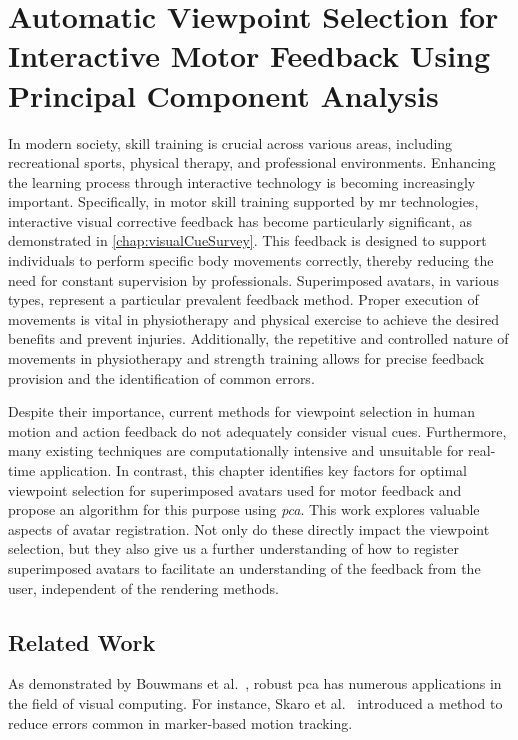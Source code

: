 
\chapter[Automatic Viewpoint Selection for Interactive Motor Feedback Using PCA]{Automatic Viewpoint Selection for Interactive Motor Feedback Using Principal Component Analysis\label{chap:viewpoint}}
In modern society, skill training is crucial across various areas, including recreational sports, physical therapy, and professional environments. Enhancing the learning process through interactive technology is becoming increasingly important. Specifically, in motor skill training supported by \acrshort{mr} technologies, interactive visual corrective feedback has become particularly significant, as demonstrated in \autoref{chap:visualCueSurvey}. This feedback is designed to support individuals to perform specific body movements correctly, thereby reducing the need for constant supervision by professionals. Superimposed avatars, in various types, represent a particular prevalent feedback method. Proper execution of movements is vital in physiotherapy and physical exercise to achieve the desired benefits and prevent injuries. Additionally, the repetitive and controlled nature of movements in physiotherapy and strength training allows for precise feedback provision and the identification of common errors.

Despite their importance, current methods for viewpoint selection in human motion and action feedback do not adequately consider visual cues. Furthermore, many existing techniques are computationally intensive and unsuitable for real-time application. In contrast, this chapter identifies key factors for optimal viewpoint selection for superimposed avatars used for motor feedback and propose an algorithm for this purpose using \emph{\acrshort{pca}}. This work explores valuable aspects of avatar registration. Not only do these directly impact the viewpoint selection, but they also give us a further understanding of how to register superimposed avatars to facilitate an understanding of the feedback from the user, independent of the rendering methods.

\section{Related Work \label{sec:relView}}
As demonstrated by Bouwmans et al.~\cite{bouwmans2018arpca}, robust \acrshort{pca} has numerous applications in the field of visual computing. For instance, Skaro et al.~\cite{skaro2021knac} introduced a method to reduce errors common in marker-based motion tracking.

